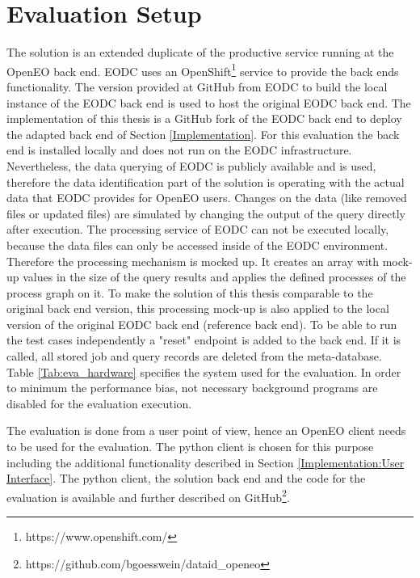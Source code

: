 \documentclass[draft,final]{vutinfth} %
\begin{document}
\section{Evaluation Setup}\label{Evaluation:Setup}
The solution is an extended duplicate of the productive service running at the OpenEO back end. EODC uses an OpenShift\footnote{https://www.openshift.com/} service to provide the back ends functionality. The version provided at GitHub from EODC to build the local instance of the EODC back end is used to host the original EODC back end. The implementation of this thesis is a GitHub fork of the EODC back end to deploy the adapted back end of Section \ref{Implementation}. For this evaluation the back end is installed locally and does not run on the EODC infrastructure. Nevertheless, the data querying of EODC is publicly available and is used, therefore the data identification part of the solution is operating with the actual data that EODC provides for OpenEO users. Changes on the data (like removed files or updated files) are simulated by changing the output of the query directly after execution. The processing service of EODC can not be executed locally, because the data files can only be accessed inside of the EODC environment. Therefore the processing mechanism is mocked up. It creates an array with mock-up values in the size of the query results and applies the defined processes of the process graph on it. To make the solution of this thesis comparable to the original back end version, this processing mock-up is also applied to the local version of the original EODC back end (reference back end). To be able to run the test cases independently a "reset" endpoint is added to the back end. If it is called, all stored job and query records are deleted from the meta-database. \\

Table \ref{Tab:eva_hardware} specifies the system used for the evaluation. In order to minimum the performance bias, not necessary background programs are disabled for the evaluation execution.  

The evaluation is done from a user point of view, hence an OpenEO client needs to be used for the evaluation. The python client is chosen for this purpose including the additional functionality described in Section \ref{Implementation:User Interface}. The python client, the solution back end and the code for the evaluation is available and further described on GitHub\footnote{https://github.com/bgoesswein/dataid\_openeo}. \\ 
\end{document}

